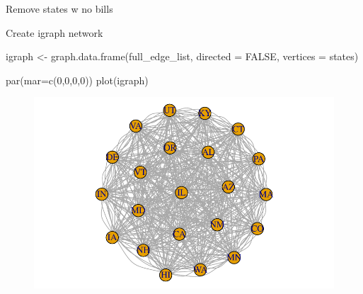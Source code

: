 \documentclass[
  letterpaper,
  DIV=11,
  numbers=noendperiod]{scrartcl}
\newenvironment{Shaded}{\begin{snugshade}}{\end{snugshade}}
\newcommand{\AttributeTok}[1]{\textcolor[rgb]{0.40,0.45,0.13}{#1}}
\newcommand{\ConstantTok}[1]{\textcolor[rgb]{0.56,0.35,0.01}{#1}}
\newcommand{\DecValTok}[1]{\textcolor[rgb]{0.68,0.00,0.00}{#1}}
\newcommand{\FunctionTok}[1]{\textcolor[rgb]{0.28,0.35,0.67}{#1}}
\newcommand{\NormalTok}[1]{\textcolor[rgb]{0.00,0.23,0.31}{#1}}
\newcommand{\OtherTok}[1]{\textcolor[rgb]{0.00,0.23,0.31}{#1}}
\begin{document}
Remove states w no bills

Create igraph network

\begin{Shaded}
\begin{Highlighting}[]
\NormalTok{igraph }\OtherTok{\textless{}{-}} \FunctionTok{graph.data.frame}\NormalTok{(full\_edge\_list, }\AttributeTok{directed =} \ConstantTok{FALSE}\NormalTok{, }\AttributeTok{vertices =}\NormalTok{ states)}

\FunctionTok{par}\NormalTok{(}\AttributeTok{mar=}\FunctionTok{c}\NormalTok{(}\DecValTok{0}\NormalTok{,}\DecValTok{0}\NormalTok{,}\DecValTok{0}\NormalTok{,}\DecValTok{0}\NormalTok{))}
\FunctionTok{plot}\NormalTok{(igraph)}
\end{Highlighting}
\end{Shaded}

\begin{figure}[H]

{\centering \includegraphics{state_dyadic_regression_files/figure-pdf/unnamed-chunk-4-1.pdf}

}

\end{figure}
\end{document}
